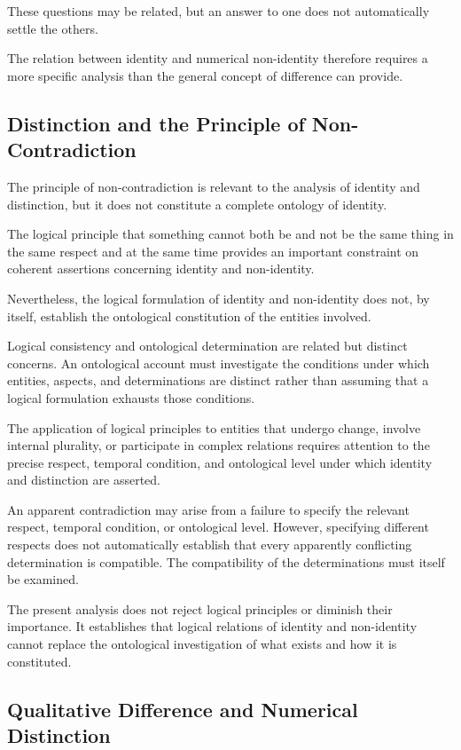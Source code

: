 These questions may be related, but an answer
to one does not automatically settle the others.

The relation between identity and numerical
non-identity therefore requires a more specific
analysis than the general concept of difference
can provide.

\subsection{Distinction and the Principle of Non-Contradiction}

The principle of non-contradiction is relevant
to the analysis of identity and distinction,
but it does not constitute a complete ontology
of identity.

The logical principle that something cannot
both be and not be the same thing in the same
respect and at the same time provides an
important constraint on coherent assertions
concerning identity and non-identity.

Nevertheless, the logical formulation of
identity and non-identity does not, by itself,
establish the ontological constitution of the
entities involved.

Logical consistency and ontological determination
are related but distinct concerns. An ontological
account must investigate the conditions under
which entities, aspects, and determinations
are distinct rather than assuming that a logical
formulation exhausts those conditions.

The application of logical principles to entities
that undergo change, involve internal plurality,
or participate in complex relations requires
attention to the precise respect, temporal
condition, and ontological level under which
identity and distinction are asserted.

An apparent contradiction may arise from a
failure to specify the relevant respect, temporal
condition, or ontological level. However,
specifying different respects does not
automatically establish that every apparently
conflicting determination is compatible.
The compatibility of the determinations must
itself be examined.

The present analysis does not reject logical
principles or diminish their importance.
It establishes that logical relations of identity
and non-identity cannot replace the ontological
investigation of what exists and how it is
constituted.

\subsection{Qualitative Difference and Numerical Distinction}

